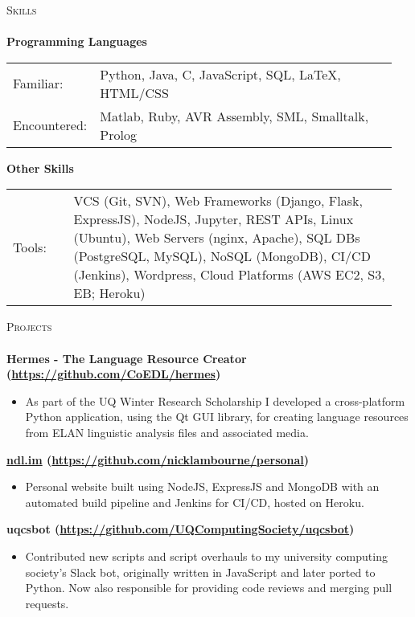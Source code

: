 \documentclass[a4paper]{article}
\newcommand{\lineunder} {
    \vspace*{-8pt} \\
    \hspace*{-10pt} \hrulefill \\
}
\newcommand{\header} [1] {
    {\hspace*{-10pt}\vspace*{6pt} \textsc{#1}}
    \vspace*{-6pt} \lineunder
}
\newenvironment{singleitem}
{   \small
    \vspace{-2.6pt}
    \begin{itemize}
    \setlength{\itemsep}{0pt}
    \setlength{\parskip}{0pt}
    \setlength{\parsep}{0pt}   }
{\end{itemize} \vspace{-2.6pt}	}
\begin{document}
\vspace{-1mm}
\header{Skills}
\textbf{Programming Languages}
\begin{tabular}{p{0.15\linewidth}p{0.80\linewidth}}
	\small Familiar: & \small Python, Java, C, JavaScript, SQL, \LaTeX, HTML/CSS \\
	\small Encountered: & \small Matlab, Ruby, AVR Assembly, SML, Smalltalk, Prolog\\
\end{tabular}
\textbf{Other Skills}
\begin{tabular}{p{0.15\linewidth}p{0.80\linewidth}}
	\small Tools: & \small VCS (Git, SVN), Web Frameworks (Django, Flask, ExpressJS), NodeJS,  Jupyter, REST APIs, Linux (Ubuntu), Web Servers (nginx, Apache), SQL DBs (PostgreSQL, MySQL), NoSQL (MongoDB), CI/CD (Jenkins), Wordpress, Cloud Platforms (AWS EC2, S3, EB; Heroku)
\end{tabular}

\vspace{0mm}

\header{Projects}

\textbf{{Hermes - The Language Resource Creator} (\href{https://github.com/CoEDL/hermes}{https://github.com/CoEDL/hermes})}
\begin{singleitem}
	\item As part of the UQ Winter Research Scholarship I developed a cross-platform Python application, using the Qt GUI library, for creating language resources from ELAN linguistic analysis files and associated media.
\end{singleitem}

\textbf{\href{https://ndl.im}{ndl.im} (\href{https://github.com/nicklambourne/personal}{https://github.com/nicklambourne/personal})}
\begin{singleitem}
	\item Personal website built using NodeJS, ExpressJS and MongoDB with an automated build pipeline and Jenkins for CI/CD, hosted on Heroku.
\end{singleitem}

\textbf{uqcsbot (\href{https://github.com/UQComputingSociety/uqcsbot}{https://github.com/UQComputingSociety/uqcsbot})}
\begin{singleitem}
	\item Contributed new scripts and script overhauls to my university computing society's Slack bot, originally written in JavaScript and later ported to Python. Now also responsible for providing code reviews and merging pull requests.
\end{singleitem}
\end{document}
